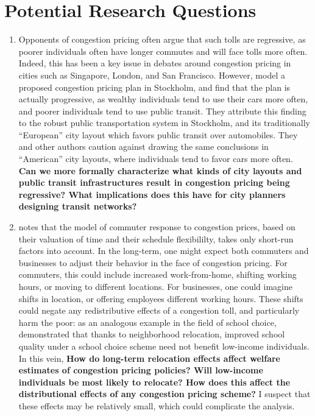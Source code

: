 \documentclass[JEL]{AEA}
\begin{document}
\section{Potential Research Questions}
\label{research-questions}

\begin{enumerate}

\item Opponents of congestion pricing often argue that such tolls are regressive, as poorer individuals often have longer commutes and will face tolls more often. Indeed, this has been a key issue in debates around congestion pricing in cities such as Singapore, London, and San Francisco. However, \cite{eliasson-2006} model a proposed congestion pricing plan in Stockholm, and find that the plan is actually progressive, as wealthy individuals tend to use their cars more often, and poorer individuals tend to use public transit. They attribute this finding to the robust public transportation system in Stockholm, and its traditionally ``European” city layout which favors public transit over automobiles. They and other authors caution against drawing the same conclusions in ``American” city layouts, where individuals tend to favor cars more often. \textbf{Can we more formally characterize what kinds of city layouts and public transit infrastructures result in congestion pricing being regressive? What implications does this have for city planners designing transit networks?}

\item \cite{kreindler-2018} notes that the model of commuter response to congestion prices, based on their valuation of time and their schedule flexibililty, takes only short-run factors into account. In the long-term, one might expect both commuters and businesses to adjust their behavior in the face of congestion pricing. For commuters, this could include increased work-from-home, shifting working hours, or moving to different locations. For businesses, one could imagine shifts in location, or offering employees different working hours. These shifts could negate any redistributive effects of a congestion toll, and particularly harm the poor: as an analogous example in the field of school choice, \cite{avery-2021} demonstrated that thanks to neighborhood relocation, improved school quality under a school choice scheme need not benefit low-income individuals. In this vein, \textbf{How do long-term relocation effects affect welfare estimates of congestion pricing policies? Will low-income individuals be most likely to relocate? How does this affect the distributional effects of any congestion pricing scheme?} I suspect that these effects may be relatively small, which could complicate the analysis.


\end{enumerate}
\end{document}
